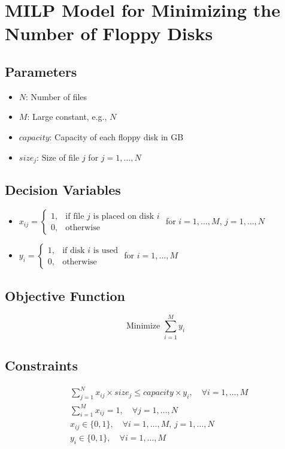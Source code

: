 \documentclass{article}
\begin{document}
\section*{MILP Model for Minimizing the Number of Floppy Disks}

\subsection*{Parameters}
\begin{itemize}
    \item $N$: Number of files
    \item $M$: Large constant, e.g., $N$
    \item $capacity$: Capacity of each floppy disk in GB
    \item $size_j$: Size of file $j$ for $j = 1, \ldots, N$
\end{itemize}

\subsection*{Decision Variables}
\begin{itemize}
    \item $x_{ij} = \begin{cases} 
        1, & \text{if file } j \text{ is placed on disk } i \\
        0, & \text{otherwise}
    \end{cases}$ for $i = 1, \ldots, M$, $j = 1, \ldots, N$
    \item $y_i = \begin{cases} 
        1, & \text{if disk } i \text{ is used} \\
        0, & \text{otherwise}
    \end{cases}$ for $i = 1, \ldots, M$
\end{itemize}

\subsection*{Objective Function}
\[
\text{Minimize } \sum_{i=1}^{M} y_i
\]

\subsection*{Constraints}
\begin{align}
    & \sum_{j=1}^{N} x_{ij} \times size_j \leq capacity \times y_i, \quad \forall i = 1, \ldots, M \\
    & \sum_{i=1}^{M} x_{ij} = 1, \quad \forall j = 1, \ldots, N \\
    & x_{ij} \in \{0, 1\}, \quad \forall i = 1, \ldots, M, \, j = 1, \ldots, N \\
    & y_i \in \{0, 1\}, \quad \forall i = 1, \ldots, M
\end{align}
\end{document}
